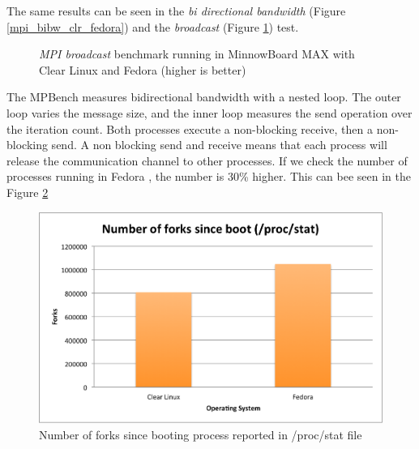 The same results can be seen in the \textit{bi directional bandwidth} (Figure
\ref{mpi_bibw_clr_fedora}) and the \textit{broadcast} (Figure
\ref{mpi_broadcast_clr_fedora}) test. 

\begin{figure}[H]
\begin{center}
\end{center}
\caption{\textit{MPI broadcast} benchmark running in  MinnowBoard MAX with Clear Linux and
Fedora (higher is better)}
\label{mpi_broadcast_clr_fedora}
\end{figure}

The MPBench measures bidirectional bandwidth with a nested loop. The outer loop
varies the message size, and the inner loop measures the send operation over
the iteration count. Both processes execute a non-blocking receive, then a
non-blocking send.  A non blocking send and receive means that each process
will release the communication channel to other processes. If we check the
number of processes running in Fedora , the number is 30\% higher. This can bee
seen in the Figure \ref{number_forks_fedora_clr}

\begin{figure}[H]
\centering
\includegraphics[width=1 \textwidth]{images/number_forks.png}
\caption{Number of forks since booting process reported in /proc/stat file }
\label{number_forks_fedora_clr}
\end{figure}

